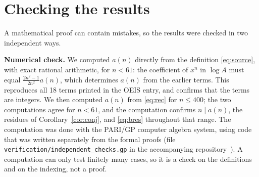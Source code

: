 \documentclass[11pt,a4paper]{article}
\theoremstyle{definition}
\theoremstyle{remark}
\newcommand{\para}[1]{\par\medskip\noindent\textbf{#1}\enspace}
\begin{document}
\section{Checking the results}\label{sec:checks}

A mathematical proof can contain mistakes, so the results were checked in two independent ways.

\para{Numerical check.}
We computed $a(n)$ directly from the definition \eqref{eq:source}, with exact rational arithmetic, for $n<61$:
the coefficient of $x^n$ in $\log A$ must equal $\frac{2n^2-1}{2n^2}a(n)$, which determines $a(n)$ from the earlier
terms. This reproduces all 18 terms printed in the OEIS entry, and confirms that the terms are integers. We then computed
$a(n)$ from \eqref{eq:rec} for $n\le400$; the two computations agree for $n<61$, and the computation confirms
$n\mid a(n)$, the residues of Corollary~\ref{cor:conj}, and \eqref{eq:bres} throughout that range.
The computation was done with the PARI/GP computer algebra system, using code that was written separately from the
formal proofs (file \texttt{verification/independent\_checks.gp} in the accompanying repository~\cite{repo}).
A computation can only test finitely many cases, so it is a check on the definitions and on the indexing, not a proof.
\end{document}
